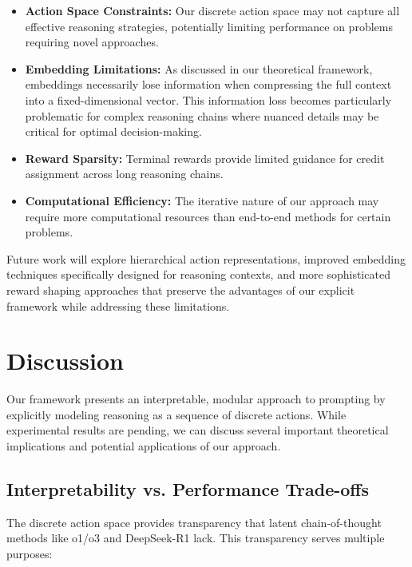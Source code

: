 \documentclass[10pt,journal,compsoc]{IEEEtran}
\begin{document}
\begin{itemize}
\item \textbf{Action Space Constraints:} Our discrete action space may not capture all effective reasoning strategies, potentially limiting performance on problems requiring novel approaches.

\item \textbf{Embedding Limitations:} As discussed in our theoretical framework, embeddings necessarily lose information when compressing the full context into a fixed-dimensional vector. This information loss becomes particularly problematic for complex reasoning chains where nuanced details may be critical for optimal decision-making.

\item \textbf{Reward Sparsity:} Terminal rewards provide limited guidance for credit assignment across long reasoning chains.

\item \textbf{Computational Efficiency:} The iterative nature of our approach may require more computational resources than end-to-end methods for certain problems.
\end{itemize}

Future work will explore hierarchical action representations, improved embedding techniques specifically designed for reasoning contexts, and more sophisticated reward shaping approaches that preserve the advantages of our explicit framework while addressing these limitations.

\section{Discussion}

Our framework presents an interpretable, modular approach to prompting by explicitly modeling reasoning as a sequence of discrete actions. While experimental results are pending, we can discuss several important theoretical implications and potential applications of our approach.

\subsection{Interpretability vs. Performance Trade-offs}

The discrete action space provides transparency that latent chain-of-thought methods like o1/o3 and DeepSeek-R1 lack. This transparency serves multiple purposes:
\end{document}
